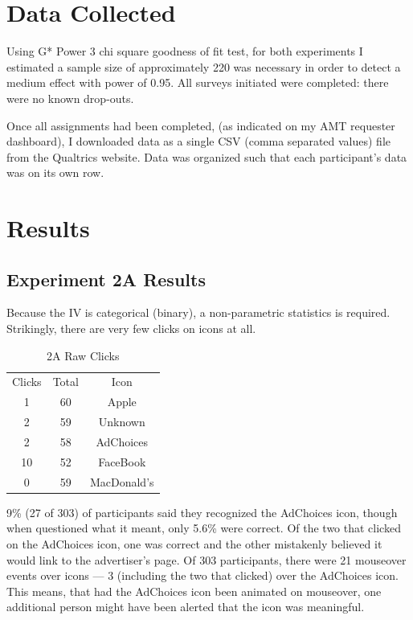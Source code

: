 \section{Data Collected}
\label{datacollected}

Using G* Power 3  \citep{PowerAnalysisIntro:2012uy}  chi square goodness of fit test, for both experiments I estimated a sample size of approximately 220 was necessary in order to detect a medium effect with power of 0.95. All surveys initiated were completed: there were no known drop-outs.

Once all assignments had been completed, (as indicated on my AMT requester dashboard), I downloaded data as a single CSV (comma separated values) file from the Qualtrics website. Data was organized such that each participant's data was on its own row.

\section{Results}
\label{results}

\subsection{Experiment 2A Results}
\label{experiment2aresults}

Because the IV is categorical (binary), a non-parametric statistics is required. Strikingly, there are very few clicks on icons at all.


\begin{table}
\caption{2A Raw Clicks}
\centering
\begin{tabular}{ccc}
Clicks & Total & Icon\tabularnewline
1 & 60 & Apple\tabularnewline
2 & 59 & Unknown\tabularnewline
2 & 58 & AdChoices\tabularnewline
10 & 52 & FaceBook\tabularnewline
0 & 59 & MacDonald's\tabularnewline
\end{tabular}
\end{table}


9\% (27 of 303) of participants said they recognized the AdChoices icon, though when questioned what it meant, only 5.6\% were correct. Of the two that clicked on the AdChoices icon, one was correct and the other mistakenly believed it would link to the advertiser's page. Of 303 participants, there were 21 mouseover events over icons --- 3 (including the two that clicked) over the AdChoices icon. This means, that had the AdChoices icon been animated on mouseover, one additional person might have been alerted that the icon was meaningful.


